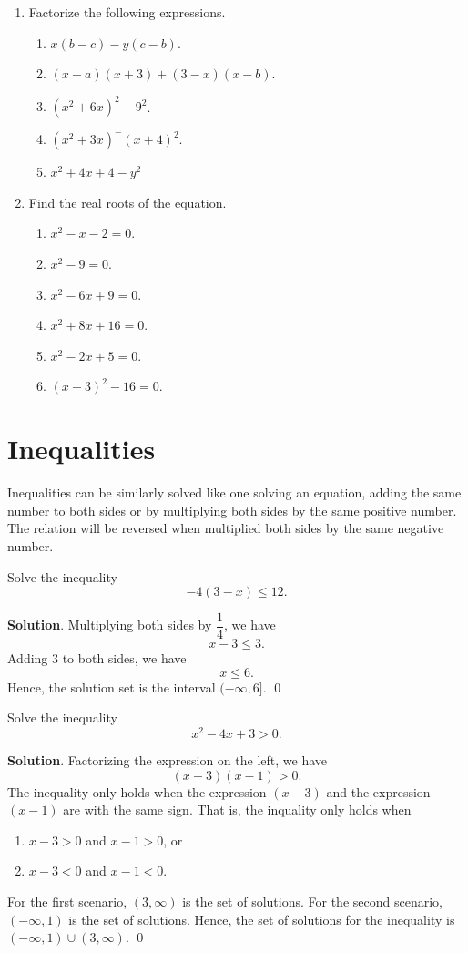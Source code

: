 \documentclass[11pt]{book}
\theoremstyle{break}
\theoremstyle{no_label}
\numberwithin{equation}{section}
\begin{document}
\begin{enumerate}[label=\arabic*.]
\begin{enumerate}
    \end{enumerate}
    \item Factorize the following expressions.
    \begin{enumerate}
        \item $x(b-c)-y(c-b)$.
        \item $(x-a)(x+3)+(3-x)(x-b)$.
        \item $(x^2+6x)^2-9^2$.
        \item $(x^2+3x)^-(x+4)^2$.
        \item $x^2+4x+4-y^2$
    \end{enumerate}
    \item Find the real roots of the equation.
    \begin{enumerate}
        \item $x^2-x-2=0$.
        \item $x^2-9=0$.
        \item $x^2-6x+9=0$.
        \item $x^2+8x+16=0$.
        \item $x^2-2x+5=0$.
        \item $(x-3)^2-16=0$.
    \end{enumerate}
\end{enumerate}

\section{Inequalities}

Inequalities can be similarly solved like one solving an equation, adding the same number to both sides or by multiplying both sides by the same positive number. The relation will be reversed when multiplied both sides by the same negative number.

\begin{example}
    Solve the inequality $$-4(3-x)\leq 12.$$
\end{example}
\textbf{Solution}. Multiplying both sides by $\dfrac{1}{4}$, we have $$x-3\leq 3.$$ Adding $3$ to both sides, we have $$x\leq 6.$$ Hence, the solution set is the interval $(-\infty, 6]$. \qed

\begin{example}
    Solve the inequality $$x^2-4x+3>0.$$
\end{example}
\textbf{Solution}. Factorizing the expression on the left, we have $$(x-3)(x-1)>0.$$ The inequality only holds when the expression $(x-3)$ and the expression $(x-1)$ are with the same sign. That is, the inquality only holds when \begin{enumerate}
    \item $x-3>0$ and $x-1>0$, or
    \item $x-3<0$ and $x-1<0$.
\end{enumerate}
For the first scenario, $(3, \infty)$ is the set of solutions. For the second scenario, $(-\infty, 1)$ is the set of solutions. Hence, the set of solutions for the inequality is $(-\infty, 1)\cup(3, \infty)$. \qed
\end{document}

